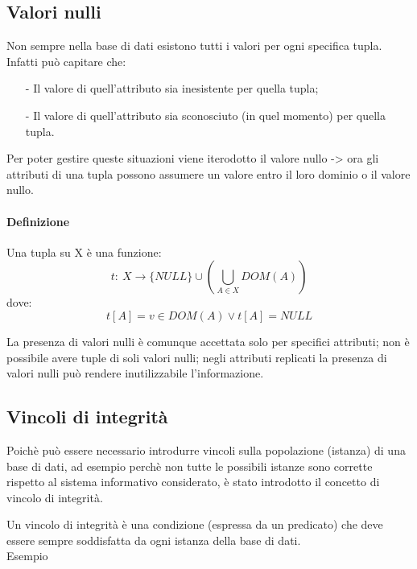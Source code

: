 \documentclass[a4paper, 10pt]{report}
\begin{document}
\subsection*{Valori nulli}
Non sempre nella base di dati esistono tutti i valori per ogni specifica tupla. Infatti può capitare che:
\begin{itemize}
\item[-] Il valore di quell'attributo sia inesistente per quella tupla;
\item[-] Il valore di quell'attributo sia sconosciuto (in quel momento) per quella tupla.
\end{itemize}

\noindent Per poter gestire queste situazioni viene iterodotto il valore nullo -> ora gli attributi di una tupla possono assumere un valore entro il loro dominio o il valore nullo.

\paragraph*{Definizione} Una tupla su X è una funzione:
			\[
				t : \: X \rightarrow \{NULL\} \cup ( \bigcup_{A\in X} DOM (A))
			\]
			dove:
			\[
				t [ A ] = v \in DOM (A) \vee t[A] = NULL
			\]

\noindent La presenza di valori nulli è comunque accettata solo per specifici attributi; non è possibile avere tuple di soli valori nulli; negli attributi replicati la presenza di valori nulli può rendere inutilizzabile l'informazione.

\subsection*{Vincoli di integrità}
Poichè può essere necessario introdurre vincoli sulla popolazione (istanza) di una base di dati, ad esempio perchè non tutte le possibili istanze sono corrette
rispetto al sistema informativo considerato, è stato introdotto il concetto di vincolo di integrità.

\noindent Un vincolo di integrità è una condizione (espressa da un predicato)
che deve essere sempre soddisfatta
da ogni istanza della base di dati.\\

\noindent Esempio\\
\end{document}

